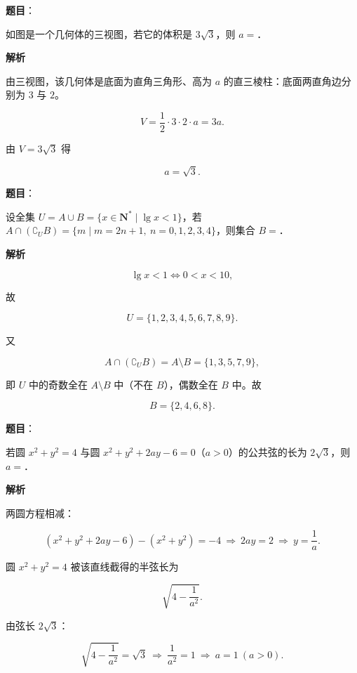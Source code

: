 \begin{answer}

\textbf{题目}：

如图是一个几何体的三视图，若它的体积是 $3\sqrt3$，则 $a=$\gkblank{}．
\nopagebreak[4]
\begin{center}\end{center}
\nopagebreak[4]
\textbf{解析}

由三视图，该几何体是底面为直角三角形、高为 $a$ 的直三棱柱：底面两直角边分别为 $3$ 与 $2$。

\nopagebreak[4]
\[V=\frac12\cdot3\cdot2\cdot a=3a .\]

由 $V=3\sqrt3$ 得

\nopagebreak[4]
\[a=\sqrt3 .\]


\end{answer}
\begin{answer}

\textbf{题目}：

设全集 $U=A\cup B=\{x\in\mathbf N^*\mid \lg x<1\}$，若 $A\cap(\complement_UB)=\{m\mid m=2n+1,\ n=0,1,2,3,4\}$，则集合 $B=$\gkblank{}．

\textbf{解析}

\nopagebreak[4]
\[\lg x<1\iff 0<x<10,\]

故

\nopagebreak[4]
\[U=\{1,2,3,4,5,6,7,8,9\} .\]

又

\nopagebreak[4]
\[A\cap(\complement_UB)=A\setminus B=\{1,3,5,7,9\},\]

即 $U$ 中的奇数全在 $A\setminus B$ 中（不在 $B$），偶数全在 $B$ 中。故

\nopagebreak[4]
\[B=\{2,4,6,8\} .\]


\end{answer}
\begin{answer}

\textbf{题目}：

若圆 $x^2+y^2=4$ 与圆 $x^2+y^2+2ay-6=0$（$a>0$）的公共弦的长为 $2\sqrt3$，则 $a=$\gkblank{}．

\textbf{解析}

两圆方程相减：

\nopagebreak[4]
\[(x^2+y^2+2ay-6)-(x^2+y^2)= -4
\ \Longrightarrow\ 2ay=2\ \Longrightarrow\ y=\frac1a .\]

圆 $x^2+y^2=4$ 被该直线截得的半弦长为

\nopagebreak[4]
\[\sqrt{4-\frac1{a^2}} .\]

由弦长 $2\sqrt3$：

\nopagebreak[4]
\[\sqrt{4-\frac1{a^2}}=\sqrt3
\ \Longrightarrow\ \frac1{a^2}=1
\ \Longrightarrow\ a=1\ (a>0).\]


\end{answer}
